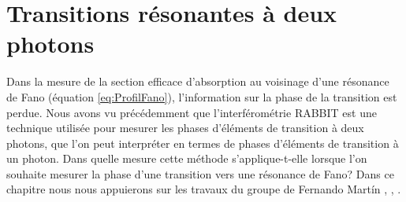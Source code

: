 \chapter{Transitions résonantes à deux photons}
Dans la mesure de la section efficace d'absorption au voisinage d'une résonance de Fano (équation \ref{eq:ProfilFano}), l'information sur la phase de la transition est perdue. Nous avons vu précédemment que l'interférométrie RABBIT est une technique utilisée pour mesurer les phases d'éléments de transition à deux photons, que l'on peut interpréter en termes de phases d'éléments de transition à un photon. Dans quelle mesure cette méthode s'applique-t-elle lorsque l'on souhaite mesurer la phase d'une transition vers une résonance de Fano? Dans ce chapitre nous nous appuierons sur les travaux du groupe de Fernando Mart\'{i}n , , .

